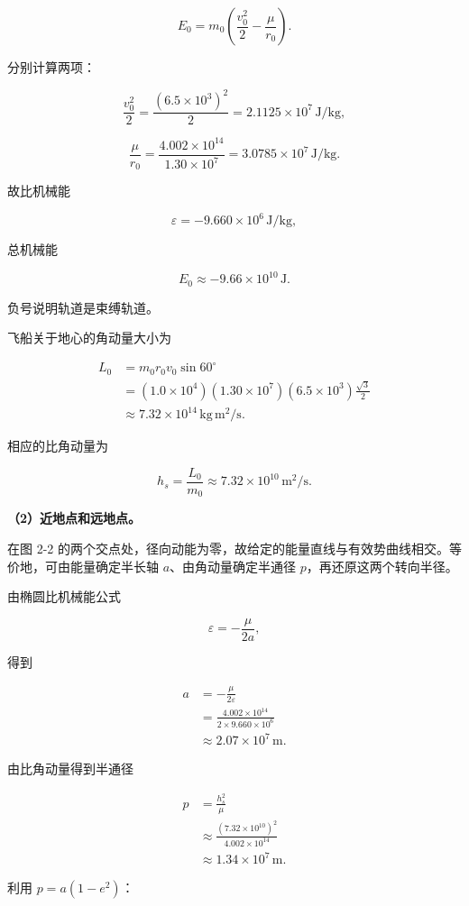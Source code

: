 \documentclass[12pt,a4paper,UTF8]{ctexart}
\begin{document}
\[E_0=m_0\left(\frac{v_0^2}{2}-\frac\mu{r_0}\right).\]

分别计算两项：

\[\frac{v_0^2}{2}=\frac{(6.5\times10^3)^2}{2}
=2.1125\times10^7\,\mathrm{J/kg},\]

\[\frac\mu{r_0}=\frac{4.002\times10^{14}}{1.30\times10^7}
=3.0785\times10^7\,\mathrm{J/kg}.\]

故比机械能

\[\varepsilon=-9.660\times10^6\,\mathrm{J/kg},\]

总机械能

\[\boxed{E_0\approx-9.66\times10^{10}\,\mathrm J}.\]

负号说明轨道是束缚轨道。

飞船关于地心的角动量大小为

\[
\begin{aligned}
L_0&=m_0r_0v_0\sin60^\circ\\
&=(1.0\times10^4)(1.30\times10^7)(6.5\times10^3)\frac{\sqrt3}{2}\\
&\approx\boxed{7.32\times10^{14}\,\mathrm{kg\,m^2/s}}.
\end{aligned}
\]

相应的比角动量为

\[h_s=\frac{L_0}{m_0}\approx7.32\times10^{10}\,\mathrm{m^2/s}.\]

\textbf{（2）近地点和远地点。}

在图 2-2
的两个交点处，径向动能为零，故给定的能量直线与有效势曲线相交。等价地，可由能量确定半长轴
\(a\)、由角动量确定半通径 \(p\)，再还原这两个转向半径。

由椭圆比机械能公式

\[\varepsilon=-\frac\mu{2a},\]

得到

\[
\begin{aligned}
a&=-\frac\mu{2\varepsilon}\\
&=\frac{4.002\times10^{14}}{2\times9.660\times10^6}\\
&\approx2.07\times10^7\,\mathrm m.
\end{aligned}
\]

由比角动量得到半通径

\[
\begin{aligned}
p&=\frac{h_s^2}{\mu}\\
&\approx\frac{(7.32\times10^{10})^2}{4.002\times10^{14}}\\
&\approx1.34\times10^7\,\mathrm m.
\end{aligned}
\]

利用 \(p=a(1-e^2)\)：
\end{document}
